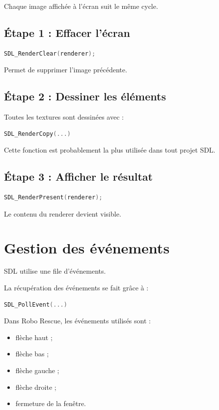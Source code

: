\documentclass[a4paper,11pt]{article}
\begin{document}
Chaque image affichée à l'écran suit le même cycle.

\subsection{Étape 1 : Effacer l'écran}

\begin{lstlisting}[language=C]
SDL_RenderClear(renderer);
\end{lstlisting}

Permet de supprimer l'image précédente.

\subsection{Étape 2 : Dessiner les éléments}

Toutes les textures sont dessinées avec :

\begin{lstlisting}[language=C]
SDL_RenderCopy(...)
\end{lstlisting}

Cette fonction est probablement la plus utilisée dans tout projet SDL.

\subsection{Étape 3 : Afficher le résultat}

\begin{lstlisting}[language=C]
SDL_RenderPresent(renderer);
\end{lstlisting}

Le contenu du renderer devient visible.

\section{Gestion des événements}

SDL utilise une file d'événements.

La récupération des événements se fait grâce à :

\begin{lstlisting}[language=C]
SDL_PollEvent(...)
\end{lstlisting}

Dans Robo Rescue, les événements utilisés sont :

\begin{itemize}
    \item flèche haut ;
    \item flèche bas ;
    \item flèche gauche ;
    \item flèche droite ;
    \item fermeture de la fenêtre.
\end{itemize}
\end{document}
